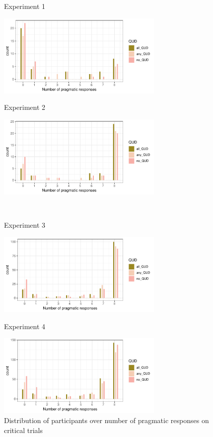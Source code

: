 \documentclass[12pt]{article}
\begin{document}
\begin{figure}[!h] 
    \centering
    \begin{minipage}{.5\textwidth}
    \caption*{Experiment 1}
    \includegraphics[height=4cm]{img/exp1_count_pragmatic.pdf}
    \end{minipage}%
    \begin{minipage}{.5\textwidth}
    \caption*{Experiment 2}
    \includegraphics[height=4cm]{img/exp2_count_pragmatic.pdf}
    \end{minipage}%
    \\
    \begin{minipage}{.5\textwidth}
    \caption*{Experiment 3}
    \includegraphics[height=4cm]{img/exp3_count_pragmatic.pdf}
    \end{minipage}%
    \begin{minipage}{.5\textwidth}
    \caption*{Experiment 4}
    \includegraphics[height=4cm]{img/exp4_count_pragmatic.pdf}
    \end{minipage}%
    \caption{Distribution of participants over number of pragmatic responses on critical trials}
\end{figure}
\end{document}
